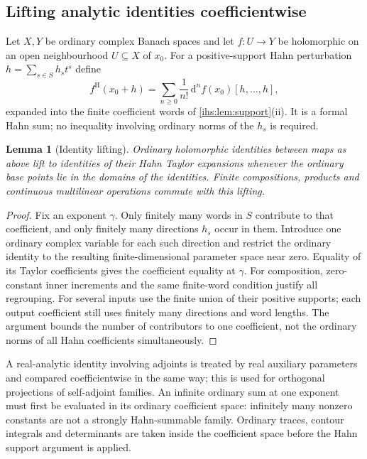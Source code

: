 \documentclass[11pt,a4paper]{article}
\numberwithin{equation}{section}
\newtheorem{lemma}[lemma]{Lemma}
\theoremstyle{definition}
\theoremstyle{remark}
\begin{document}
\subsection{Lifting analytic identities coefficientwise}\label{ihs:fr:sec:lift}
Let $X,Y$ be ordinary complex Banach spaces and let $f:U\to Y$ be
holomorphic on an open neighbourhood $U\subseteq X$ of $x_0$. For a positive-support Hahn perturbation
$h=\sum_{s\in S}h_st^s$ define
\begin{equation}\label{ihs:fr:eq:taylorlift}
 f^{\mathrm H}(x_0+h)=\sum_{n\ge0}\frac1{n!}\,\mathrm d^nf(x_0)[h,\ldots,h],
\end{equation}
expanded into the finite coefficient words of \cref{ihs:lem:support}(ii). It
is a formal Hahn sum; no inequality involving ordinary norms of the $h_s$ is
required.

\begin{lemma}[Identity lifting]\label{ihs:fr:lem:lift}
Ordinary holomorphic identities between maps as above lift to identities of
their Hahn Taylor expansions whenever the ordinary base points lie in the
domains of the identities. Finite compositions, products and continuous
multilinear operations commute with this lifting.
\end{lemma}
\begin{proof}
Fix an exponent $\gamma$. Only finitely many words in $S$ contribute to that
coefficient, and only finitely many directions $h_s$ occur in them.
Introduce one ordinary complex variable for each such direction and restrict
the ordinary identity to the resulting finite-dimensional parameter space
near zero. Equality of its Taylor coefficients gives the coefficient
equality at $\gamma$. For composition, zero-constant inner increments and the
same finite-word condition justify all regrouping.
For several inputs use the finite union of their positive supports; each
output coefficient still uses finitely many directions and word lengths.
The argument bounds the number of contributors to one coefficient, not the
ordinary norms of all Hahn coefficients simultaneously.
\end{proof}

A real-analytic identity involving adjoints is treated by real auxiliary
parameters and compared coefficientwise in the same way; this is used for
orthogonal projections of self-adjoint families. An infinite ordinary sum at
one exponent must first be evaluated in its ordinary coefficient space:
infinitely many nonzero constants are not a strongly Hahn-summable family.
Ordinary traces, contour integrals and determinants are taken inside the
coefficient space before the Hahn support argument is applied.
\end{document}
